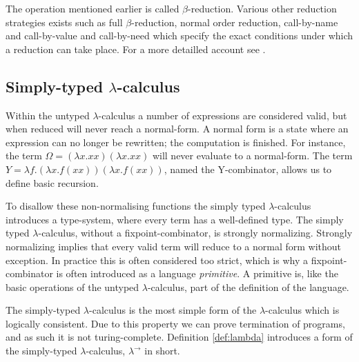 The operation mentioned earlier is called $\beta$-reduction.
Various other reduction strategies exists such as full $\beta$-reduction, normal order reduction, call-by-name and call-by-value and call-by-need which specify the exact conditions under which a reduction can take place.
For a more detailled account see \cite{barendregt1985lambda}.

\subsection{Simply-typed $\lambda$-calculus}
Within the untyped $\lambda$-calculus a number of expressions are considered valid, but when reduced will never reach a normal-form.
A normal form is a state where an expression can no longer be rewritten; the computation is finished.
For instance, the term $\Omega = (\lambda x. x x) (\lambda x. x x)$ will never evaluate to a normal-form.
The term $Y = λf.(λx.f (x x)) (λx.f (x x))$, named the Y-combinator, allows us to define basic recursion.

To disallow these non-normalising functions the simply typed $\lambda$-calculus introduces a type-system, where every term has a well-defined type.
The simply typed $\lambda$-calculus, without a fixpoint-combinator, is strongly normalizing.
Strongly normalizing implies that every valid term will reduce to a normal form without exception.
In practice this is often considered too strict, which is why a fixpoint-combinator is often introduced as a language \textit{primitive}.
A primitive is, like the basic operations of the untyped $\lambda$-calculus, part of the definition of the language.

The simply-typed $\lambda$-calculus is the most simple form of the $\lambda$-calculus which is logically consistent.
Due to this property we can prove termination of programs, and as such it is not turing-complete.
Definition \ref{def:lambda} introduces a form of the simply-typed $\lambda$-calculus, $\lambda^\rightarrow$ in short.


